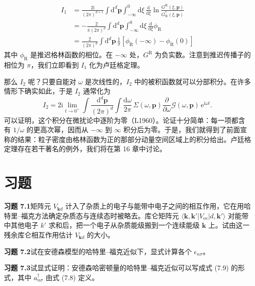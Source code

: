 \begin{align*}
I_{1} &= \frac{2\mathrm{i}}{(2\pi)^{d+1}}\int\mathrm{d}^{d}\mathbf{p}\int_{-\infty}^{0}\mathrm{d}\xi\,\frac{\mathrm{d}}{\mathrm{d}\xi}\ln\frac{G^{\mathrm{R}}(\xi,\mathbf{p})}{G^{*}_{\mathrm{R}}(\xi,\mathbf{p})} \\
&= -\frac{2}{\pi(2\pi)^{d}}\int\mathrm{d}^{d}\mathbf{p}\int_{-\infty}^{0}\mathrm{d}\xi\,\frac{\mathrm{d}}{\mathrm{d}\xi}\phi_{\mathrm{R}} \\
&= \frac{2}{(2\pi)^{d}}\int\mathrm{d}^{d}\mathbf{p}\,\frac{1}{\pi}\left[\phi_{\mathrm{R}}(-\infty) - \phi_{\mathrm{R}}(0)\right]
\tag{7.140}
\end{align*}
其中 $\phi_{\mathrm{R}}$ 是推迟格林函数的相位。在 $-\infty$ 处，$G^{\mathrm{R}}$ 为负实数。注意到推迟传播子的相位为 $\pi$，我们立即看到 $I_{1}$ 化为卢廷格定理。

那么 $I_{2}$ 呢？只要自能对 $\omega$ 是次线性的，$I_{2}$ 中的被积函数就可以分部积分。在许多情形下确实如此，于是 $I_{2}$ 通常化为
\begin{equation*}
I_{2} = 2\mathrm{i}\lim_{t \to 0^{+}}\int\frac{\mathrm{d}^{d}\mathbf{p}}{(2\pi)^{d}}\int\frac{\mathrm{d}\omega}{2\pi}\,\Sigma(\omega,\mathbf{p})\frac{\partial}{\partial\omega}\mathcal{G}(\omega,\mathbf{p})\,\mathrm{e}^{\mathrm{i}\omega t}.
\tag{7.141}
\end{equation*}
可以证明，这个积分在微扰论中逐阶为零（L1960）。论证十分简单：每一项都含有 $1/\omega$ 的更高次幂，因而从 $-\infty$ 到 $\infty$ 积分后为零。于是，我们就得到了前面宣称的结果：粒子密度由格林函数为正的那部分动量空间区域上的积分给出。卢廷格定理存在若干著名的例外，我们将在第 16 章中讨论。

\section*{习题}

\textbf{习题 7.1}\quad 矩阵元 $V_{\mathbf{k}d}$ 计入了杂质上的电子与能带中电子之间的相互作用，它在用哈特里–福克方法确定杂质态与连续态时被略去。库仑矩阵元 $\langle\mathbf{k},\mathbf{k}'|V_{\mathrm{ee}}|d,\mathbf{k}'\rangle$ 对能带中其他电子 $k'$ 求和后，把一个电子从杂质能级搬到一个连续能级 $\mathbf{k}$ 上。试由这一残余库仑相互作用估计 $V_{\mathbf{k}d}$ 的大小。

\textbf{习题 7.2}\quad 试在安德森模型的哈特里–福克近似下，显式计算各个 $\epsilon_{n\sigma}$。

\textbf{习题 7.3}\quad 试显式证明：安德森哈密顿量的哈特里–福克近似可以写成式 (7.9) 的形式，其中 $a^{\dagger}_{n\sigma}$ 由式 (7.8) 定义。

